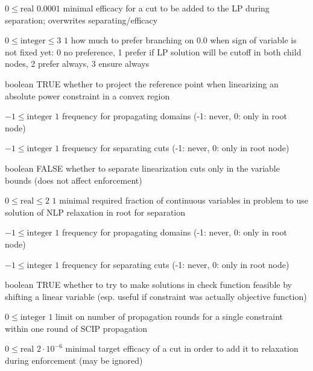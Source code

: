 %
{$0\leq\textrm{real}$}%
{$0.0001$}%
{minimal efficacy for a cut to be added to the LP during separation; overwrites separating/efficacy}%
{}

%
{$0\leq\textrm{integer}\leq3$}%
{$1$}%
{how much to prefer branching on 0.0 when sign of variable is not fixed yet: 0 no preference, 1 prefer if LP solution will be cutoff in both child nodes, 2 prefer always, 3 ensure always}%
{}

%
{boolean}%
{TRUE}%
{whether to project the reference point when linearizing an absolute power constraint in a convex region}%
{}

%
{$-1\leq\textrm{integer}$}%
{$1$}%
{frequency for propagating domains (-1: never, 0: only in root node)}%
{}

%
{$-1\leq\textrm{integer}$}%
{$1$}%
{frequency for separating cuts (-1: never, 0: only in root node)}%
{}

%
{boolean}%
{FALSE}%
{whether to separate linearization cuts only in the variable bounds (does not affect enforcement)}%
{}

%
{$0\leq\textrm{real}\leq2$}%
{$1$}%
{minimal required fraction of continuous variables in problem to use solution of NLP relaxation in root for separation}%
{}

%
{$-1\leq\textrm{integer}$}%
{$1$}%
{frequency for propagating domains (-1: never, 0: only in root node)}%
{}

%
{$-1\leq\textrm{integer}$}%
{$1$}%
{frequency for separating cuts (-1: never, 0: only in root node)}%
{}

%
{boolean}%
{TRUE}%
{whether to try to make solutions in check function feasible by shifting a linear variable (esp. useful if constraint was actually objective function)}%
{}

%
{$0\leq\textrm{integer}$}%
{$1$}%
{limit on number of propagation rounds for a single constraint within one round of SCIP propagation}%
{}

%
{$0\leq\textrm{real}$}%
{$2 \cdot 10^{- 6}$}%
{minimal target efficacy of a cut in order to add it to relaxation during enforcement (may be ignored)}%
{}

